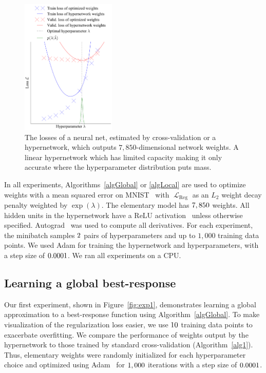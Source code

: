 \documentclass{article} %
\newcommand{\hyper}{\lambda} %
\newcommand{\lossSymbol}{\mathop{\mathcal{L}}} %
\begin{document}
\begin{figure}
	\vspace{-0.06\textheight}
	\includegraphics[width=0.4\textwidth]{hypernets_local_small.pdf}
	\caption{
	The losses of a neural net, estimated by cross-validation or a hypernetwork, which outputs $7,850$-dimensional network weights.
	A linear hypernetwork which has limited capacity making it only accurate where the hyperparameter distribution puts mass.
	\label{fig:exp2}
	}
\end{figure}
%
In all experiments, Algorithms~\ref{algGlobal} or \ref{algLocal} are used to optimize weights with a mean squared error on MNIST~\citep{lecun1998gradient} with $\lossSymbol_{\mathrm{Reg}}$ as an $L_{2}$ weight decay penalty weighted by $\exp(\hyper)$.
The elementary model has $7,850$ weights.
All hidden units in the hypernetwork have a ReLU activation~\citep{nair2010rectified} unless otherwise specified.
Autograd~\citep{maclaurin2015autograd} was used to compute all derivatives.
For each experiment, the minibatch samples $2$ pairs of hyperparameters and up to $1,000$ training data points.
We used Adam for training the hypernetwork and hyperparameters, with a step size of $0.0001$.
We ran all experiments on a CPU.
%

\subsection{Learning a global best-response}
Our first experiment, shown in Figure~\ref{fig:exp1}, demonstrates learning a global approximation to a best-response function using Algorithm~\ref{algGlobal}.
To make visualization of the regularization loss easier, we use $10$ training data points to exacerbate overfitting.
We compare the performance of weights output by the hypernetwork to those trained by standard cross-validation (Algorithm~\ref{alg1}).
Thus, elementary weights were randomly initialized for each hyperparameter choice and optimized using Adam~\citep{kingma2014adam} for $1,000$ iterations with a step size of $0.0001$.
\end{document}
